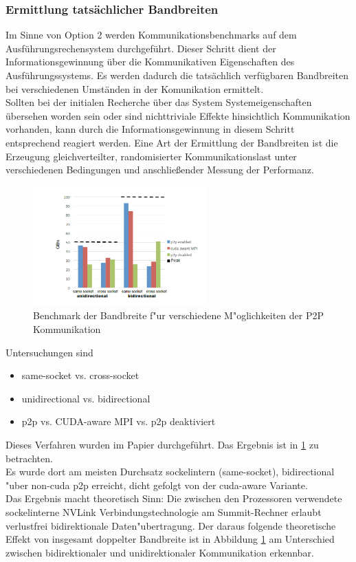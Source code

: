 \subsubsection{Ermittlung tatsächlicher Bandbreiten}
Im Sinne von Option 2 werden Kommunikationsbenchmarks auf dem Ausführungsrechensystem durchgeführt. Dieser Schritt dient der Informationsgewinnung über die Kommunikativen Eigenschaften des Ausführungssystems. Es werden dadurch die tatsächlich verfügbaren Bandbreiten bei verschiedenen Umständen in der Komunikation ermittelt.\\
Sollten bei der initialen Recherche über das System Systemeigenschaften übersehen worden sein oder sind nichttriviale Effekte hinsichtlich Kommunikation vorhanden, kann durch die Informationsgewinnung in diesem Schritt entsprechend reagiert werden.
Eine Art der Ermittlung der Bandbreiten ist die Erzeugung gleichverteilter, randomisierter Kommunikationslast unter verschiedenen Bedingungen und anschließender Messung der Performanz.\\
\begin{figure}
\centering
\includegraphics[width=0.6\textwidth]{res/bench0.png}
\caption{\cite[Abb. 4]{mainpaper} Benchmark der Bandbreite f"ur verschiedene M"oglichkeiten der P2P Kommunikation}
	\label{fig:bench0}
\end{figure}
Untersuchungen sind
\begin{itemize}
	\item same-socket vs. cross-socket
	\item unidirectional vs. bidirectional
	\item p2p vs. CUDA-aware MPI vs. p2p deaktiviert
\end{itemize}
Dieses Verfahren wurden im Papier \cite{mainpaper} durchgeführt. Das Ergebnis ist in \ref{fig:bench0} zu betrachten.\\
Es wurde dort am meisten Durchsatz sockelintern (same-socket), bidirectional "uber non-cuda p2p erreicht, dicht gefolgt von der cuda-aware Variante.\\
Das Ergebnis macht theoretisch Sinn: Die zwischen den Prozessoren verwendete sockelinterne NVLink Verbindungstechnologie am Summit-Rechner erlaubt verlustfrei bidirektionale Daten"ubertragung. Der daraus folgende theoretische Effekt von insgesamt doppelter Bandbreite ist in Abbildung \ref{fig:bench0} am Unterschied zwischen bidirektionaler und unidirektionaler Kommunikation erkennbar.\\

